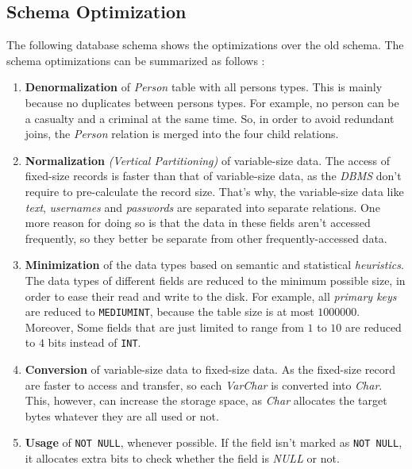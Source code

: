 \subsection{Schema Optimization}
The following database schema shows the optimizations over the old schema. The schema optimizations can be summarized as follows :
\begin{enumerate}
    \item \textbf{Denormalization} of \emph{Person} table with all persons types. This is mainly because no duplicates between persons types. For example, no person can be a casualty and a criminal at the same time. So, in order to avoid redundant joins, the \emph{Person} relation is merged into the four child relations.
    \item \textbf{Normalization} \emph{(Vertical Partitioning)} of variable-size data. The access of fixed-size records is faster than that of variable-size data, as the \emph{DBMS} don't require to pre-calculate the record size. That's why, the variable-size data like \emph{text}, \emph{usernames} and \emph{passwords} are separated into separate relations. One more reason for doing so is that the data in these fields aren't accessed frequently, so they better be separate from other frequently-accessed data.
    \item \textbf{Minimization} of the data types based on semantic and statistical \emph{heuristics}. The data types of different fields are reduced to the minimum possible size, in order to ease their read and write to the disk. For example, all \emph{primary keys} are reduced to \texttt{MEDIUMINT}, because the table size is at most $1000000$. Moreover, Some fields that are just limited to range from $1$ to $10$ are reduced to $4$ bits instead of \texttt{INT}.
    \item \textbf{Conversion} of variable-size data to fixed-size data. As the fixed-size record are faster to access and transfer, so each \emph{VarChar} is converted into \emph{Char}. This, however, can increase the storage space, as \emph{Char} allocates the target bytes whatever they are all used or not.
    \item \textbf{Usage} of \texttt{NOT NULL}, whenever possible. If the field isn't marked as \texttt{NOT NULL}, it allocates extra bits to check whether the field is \emph{NULL} or not.
\end{enumerate}

